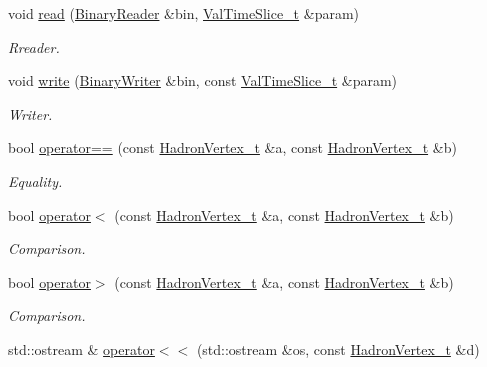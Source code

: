 \begin{DoxyCompactItemize}
void \mbox{\hyperlink{namespaceHadron_ad59dd6905268b9fa8e1bf10fef767b9b}{read}} (\mbox{\hyperlink{classADATIO_1_1BinaryReader}{Binary\+Reader}} \&bin, \mbox{\hyperlink{structHadron_1_1ValTimeSlice__t}{Val\+Time\+Slice\+\_\+t}} \&param)
\begin{DoxyCompactList}\small\item\em Rreader. \end{DoxyCompactList}\item 
void \mbox{\hyperlink{namespaceHadron_a7b503b82bc88cdec19d5b7173957b35e}{write}} (\mbox{\hyperlink{classADATIO_1_1BinaryWriter}{Binary\+Writer}} \&bin, const \mbox{\hyperlink{structHadron_1_1ValTimeSlice__t}{Val\+Time\+Slice\+\_\+t}} \&param)
\begin{DoxyCompactList}\small\item\em Writer. \end{DoxyCompactList}\item 
bool \mbox{\hyperlink{namespaceHadron_af09f672981980cb11de931b95576f828}{operator==}} (const \mbox{\hyperlink{structHadron_1_1HadronVertex__t}{Hadron\+Vertex\+\_\+t}} \&a, const \mbox{\hyperlink{structHadron_1_1HadronVertex__t}{Hadron\+Vertex\+\_\+t}} \&b)
\begin{DoxyCompactList}\small\item\em Equality. \end{DoxyCompactList}\item 
bool \mbox{\hyperlink{namespaceHadron_a43c37405dc872b3d2d1f477ca914424a}{operator$<$}} (const \mbox{\hyperlink{structHadron_1_1HadronVertex__t}{Hadron\+Vertex\+\_\+t}} \&a, const \mbox{\hyperlink{structHadron_1_1HadronVertex__t}{Hadron\+Vertex\+\_\+t}} \&b)
\begin{DoxyCompactList}\small\item\em Comparison. \end{DoxyCompactList}\item 
bool \mbox{\hyperlink{namespaceHadron_a341b896434c5621c127ef5066c50c7f0}{operator$>$}} (const \mbox{\hyperlink{structHadron_1_1HadronVertex__t}{Hadron\+Vertex\+\_\+t}} \&a, const \mbox{\hyperlink{structHadron_1_1HadronVertex__t}{Hadron\+Vertex\+\_\+t}} \&b)
\begin{DoxyCompactList}\small\item\em Comparison. \end{DoxyCompactList}\item 
std\+::ostream \& \mbox{\hyperlink{namespaceHadron_ac4fad3eded4cdc1e5e3a20c089ff92c7}{operator$<$$<$}} (std\+::ostream \&os, const \mbox{\hyperlink{structHadron_1_1HadronVertex__t}{Hadron\+Vertex\+\_\+t}} \&d)

\end{DoxyCompactItemize}

